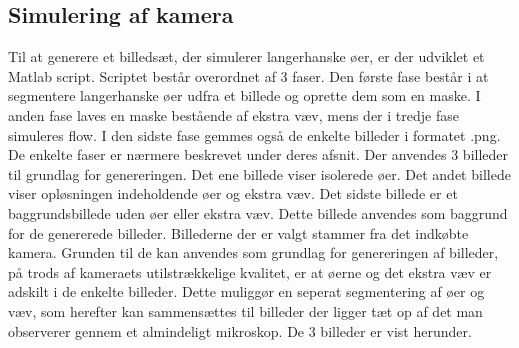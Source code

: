 \subsection{Simulering af kamera}
Til at generere et billedsæt, der simulerer langerhanske øer, er der udviklet et Matlab script. Scriptet består overordnet af 3 faser. Den første fase består i at segmentere langerhanske øer udfra et billede og oprette dem som en maske. I anden fase laves en maske bestående af ekstra væv, mens der i tredje fase simuleres flow. I den sidste fase gemmes også de enkelte billeder i formatet .png. De enkelte faser er nærmere beskrevet under deres afsnit. Der anvendes 3 billeder til grundlag for genereringen. Det ene billede viser isolerede øer. Det andet billede viser opløsningen indeholdende øer og ekstra væv. Det sidste billede er et baggrundsbillede uden øer eller ekstra væv. Dette billede anvendes som baggrund for de genererede billeder. Billederne der er valgt stammer fra det indkøbte kamera. Grunden til de kan anvendes som grundlag for genereringen af billeder, på trods af kameraets utilstrækkelige kvalitet, er at øerne og det ekstra væv er adskilt i de enkelte billeder. Dette muliggør en seperat segmentering af øer og væv, som  herefter kan sammensættes til billeder der ligger tæt op af det man observerer gennem et almindeligt mikroskop. De 3 billeder er vist herunder.

